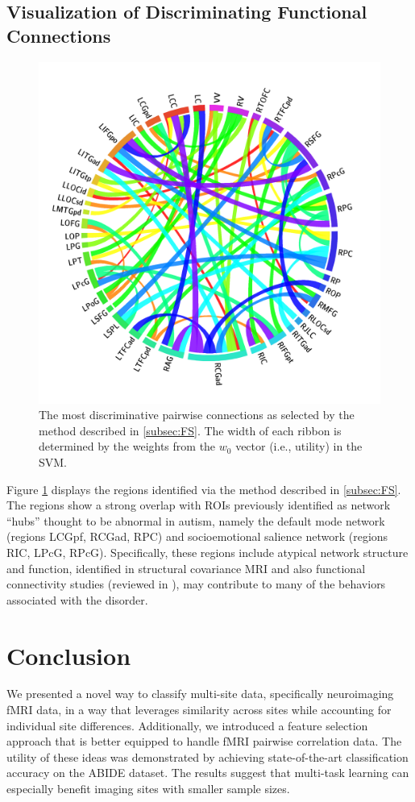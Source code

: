 \documentclass{llncs}
\begin{document}
\subsection{Visualization of Discriminating Functional Connections}
 \begin{figure}[ht]
	\centering
	\includegraphics[scale = .15]{now_circos3.png}
	\caption{The most discriminative pairwise connections as selected by the method described in \ref{subsec:FS}.  The width of each ribbon is determined by the weights from the $w_0$ vector (i.e., utility) in the SVM. }
	\label{fig:circos}
\end{figure}

Figure \ref{fig:circos} displays the regions identified via the method described
in \ref{subsec:FS}.  The regions show a strong overlap with ROIs previously
identified as network ``hubs'' thought to be abnormal in autism, namely the
default mode network (regions LCGpf, RCGad, RPC) and socioemotional salience
network (regions RIC, LPcG, RPcG).  Specifically, these regions include atypical
network structure and function, identified in structural covariance MRI
\cite{zielinski2012scmri} and also functional connectivity studies (reviewed in
\cite{jeff2014}), may contribute to many of the behaviors associated with the
disorder.

\section{Conclusion}
We presented a novel way to classify multi-site data, specifically neuroimaging
fMRI data, in a way that leverages similarity across sites while accounting for
individual site differences.  Additionally, we introduced a feature selection
approach that is better equipped to handle fMRI pairwise correlation data.  The
utility of these ideas was demonstrated by achieving state-of-the-art
classification accuracy on the ABIDE dataset. The results suggest that
multi-task learning can especially benefit imaging sites with smaller sample
sizes.


{}

\end{document}
